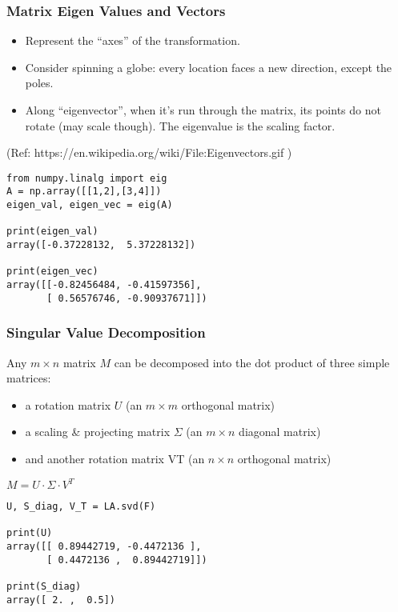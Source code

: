  \begin{frame}[fragile] \frametitle{Matrix Eigen Values and Vectors}

\begin{itemize}
\item Represent the “axes” of the transformation.
\item Consider spinning a globe: every location faces a new direction, except the poles.
\item Along ``eigenvector'', when it's run through the matrix, its points do not rotate (may scale though). The eigenvalue is the scaling factor.
\end{itemize}

{\tiny (Ref: https://en.wikipedia.org/wiki/File:Eigenvectors.gif )}

\begin{lstlisting}
from numpy.linalg import eig
A = np.array([[1,2],[3,4]])
eigen_val, eigen_vec = eig(A)

print(eigen_val)
array([-0.37228132,  5.37228132])

print(eigen_vec)
array([[-0.82456484, -0.41597356],
       [ 0.56576746, -0.90937671]])
\end{lstlisting}

\end{frame}


 \begin{frame}[fragile] \frametitle{Singular Value Decomposition}

Any $m \times n$  matrix $M$ can be decomposed into the dot product of three simple matrices:
\begin{itemize}
\item a rotation matrix $U$  (an $m \times m$ orthogonal matrix)
\item a scaling \& projecting matrix $\Sigma$ (an $m \times n$ diagonal matrix)
\item and another rotation matrix  VT  (an $n \times n$ orthogonal matrix)
\end{itemize}

$M = U \cdot \Sigma \cdot V^{T}$

\begin{lstlisting}
U, S_diag, V_T = LA.svd(F)

print(U)
array([[ 0.89442719, -0.4472136 ],
       [ 0.4472136 ,  0.89442719]])
			 
print(S_diag)
array([ 2. ,  0.5])
\end{lstlisting}

\end{frame}
